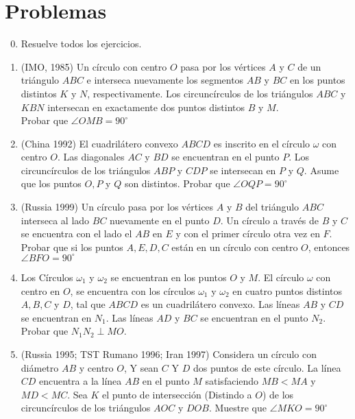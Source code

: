 \documentclass[11pt, a4paper]{article}
\begin{document}
\section{Problemas}
\begin{enumerate}
	\setcounter{enumi}{-1}
	\item Resuelve todos los ejercicios.
	\item (IMO, 1985) Un c\'irculo con centro $O$ pasa por los v\'ertices $A$ y $C$ de un tri\'angulo $ABC$ e interseca nuevamente los segmentos $AB$ y $BC$ en los puntos distintos $K$ y $N$, respectivamente. Los circunc\'irculos de los tri\'angulos $ABC$ y $KBN$ intersecan en exactamente dos puntos distintos $B$ y $M$.\\
	Probar que $\angle OMB = 90^{\circ}$
	
	\item (China 1992) El cuadril\'atero convexo $ABCD$ es inscrito en el c\'irculo $\omega$ con centro $O$. Las diagonales $AC$ y $BD$ se encuentran en el punto $P$. Los circunc\'irculos de los tri\'angulos $ABP$ y $CDP$ se intersecan en $P$ y $Q$. Asume que los puntos $O,P$ y $Q$ son distintos. Probar que $\angle OQP = 90^{\circ}$
	
	\item (Russia 1999) Un c\'irculo pasa por los v\'ertices $A$ y $B$ del tri\'angulo $ABC$ interseca al lado $BC$ nuevamente en el punto $D$. Un c\'irculo a trav\'es de $B$ y $C$ se encuentra con el lado el $AB$ en $E$ y con el primer c\'irculo otra vez en $F$. Probar que si los puntos $A, E, D, C$ est\'an en un c\'irculo con centro $O$, entonces $\angle BFO = 90^{\circ}$
	\item Los C\'irculos $\omega_1$ y $\omega_2$ se encuentran en los puntos $O$ y $M$. El c\'irculo $\omega$ con centro en $O$, se encuentra con los c\'irculos $\omega_1$ y $\omega_2$ en cuatro puntos distintos $A,B,C$ y $D$, tal que $ABCD$ es un cuadril\'atero convexo. Las l\'ineas $AB$ y $CD$ se encuentran en $N_1$. Las l\'ineas $AD$ y $BC$ se encuentran en el punto $N_2$. Probar que $N_1N_2 \perp MO$.
	
	\item (Russia 1995; TST Rumano 1996; Iran 1997) Considera un c\'irculo con di\'ametro $AB$ y centro $O$, Y sean $C$ Y $D$ dos puntos de este c\'irculo. La l\'inea $CD$ encuentra a la l\'inea $AB$ en el punto $M$ satisfaciendo $MB<MA$ y $MD< MC$. Sea $K$ el punto de intersecci\'on (Distindo a $O$) de los circunc\'irculos de los tri\'angulos $AOC$ y $DOB$. Muestre que $\angle MKO = 90^{\circ}$
	

\end{enumerate}
\end{document}
